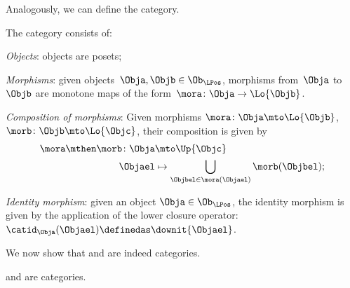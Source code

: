 Analogously, we can define the \LPos category.
\begin{definition}
\label{def:lpos_cat}
The category \LPos consists of:
\begin{compactenum}
    \item \emph{Objects}: objects are posets;
    \item \emph{Morphisms}: given objects~$\Obja,\Objb\in \Ob_\LPos$, morphisms from~$\Obja$ to~$\Objb$ are monotone maps of the form~$\mora \colon \Obja \to \Lo{\Objb}$.
    \item \emph{Composition of morphisms}: Given morphisms $\mora \colon \Obja \mto \Lo{\Objb}$, $\morb \colon \Objb\mto \Lo{\Objc}$, their composition is given by
    \begin{equation}
    \begin{aligned}
        \mora \mthen \morb \colon \Obja &\mto \Up{\Objc}\\
        \Objael&\mapsto \bigcup_{\Objbel\in \mora (\Objael)}\morb(\Objbel);
    \end{aligned}
    \end{equation}
    \item \emph{Identity morphism}: given an object $\Obja\in \Ob_\LPos$, the identity morphism is given by the application of the lower closure operator:~$\catid_\Obja(\Objael)\definedas \downit\{\Objael\}$.
\end{compactenum}
\end{definition}
We now show that \UPos and \LPos are indeed categories.
\begin{lemma}
\label{lem:upos_lpos_cats}
\UPos and \LPos are categories.
\end{lemma}


